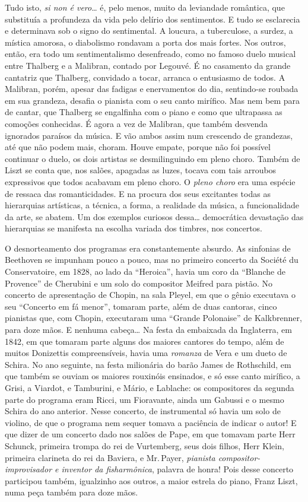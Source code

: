 Tudo isto, \textit{si non é vero}\ldots{} é, pelo menos, muito da leviandade
romântica, que substituía a profundeza da vida pelo delírio dos
sentimentos. E tudo se esclarecia e determinava sob o signo do
sentimental. A loucura, a tuberculose, a surdez, a mística amorosa, o
diabolismo rondavam a porta dos mais fortes. Nos outros, então, era todo
um sentimentalismo desenfreado, como no famoso duelo musical entre
Thalberg e a Malibran, contado por Legouvé. É no casamento da grande
cantatriz que Thalberg, convidado a tocar, arranca o entusiasmo de
todos. A Malibran, porém, apesar das fadigas e enervamentos do dia,
sentindo-se roubada em sua grandeza, desafia o pianista com o seu
canto mirífico. Mas nem bem para de cantar, que Thalberg se engalfinha
com o piano e como que ultrapassa as comoções conhecidas. É agora a vez
de Malibran, que também desvenda ignorados paraísos da música. E vão
ambos assim num crescendo de grandezas, até que não podem mais, choram.
Houve empate, porque não foi possível continuar o duelo, os dois
artistas se desmilinguindo em pleno choro. Também de Liszt se conta que,
nos salões, apagadas as luzes, tocava com tais arroubos expressivos que
todos acabavam em pleno choro. O \textit{pleno choro} era uma espécie de
ressaca das romanticidades. E na procura dos seus excitantes todas as
hierarquias artísticas, a técnica, a forma, a realidade da música, a
funcionalidade da arte, se abatem. Um dos exemplos curiosos dessa\ldots{}
democrática devastação das hierarquias se manifesta na escolha variada
dos timbres, nos concertos.

O desnorteamento dos programas era constantemente absurdo. As sinfonias
de Beethoven se impunham pouco a pouco, mas no primeiro concerto da
Société du Conservatoire, em 1828, ao lado da ``Heroica'', havia um coro
da ``Blanche de Provence'' de Cherubini e um solo do compositor Meifred
para pistão. No concerto de apresentação de Chopin, na sala Pleyel, em
que o gênio executava o seu ``Concerto em fá menor'', tomaram parte,
além de duas cantoras, cinco pianistas que, com Chopin, executaram uma
``Grande Polonaise'' de Kalkbrenner, para doze mãos. E nenhuma cabeça\ldots{}
Na festa da embaixada da Inglaterra, em 1842, em que tomaram parte
alguns dos maiores cantores do tempo, além de muitos Donizettis
compreensíveis, havia uma \textit{romanza} de Vera e um dueto de Schira. No
ano seguinte, na festa milionária do barão James de Rothschild, em que
também se ouviam os maiores rouxinóis ensinados, e só esse canto
mirífico, a Grisi, a Viardot, e Tamburini, e Mário, e Lablache: os
compositores da segunda parte do programa eram Ricci, um Fioravante,
ainda um Gabussi e o mesmo Schira do ano anterior. Nesse concerto, de
instrumental só havia um solo de violino, de que o programa nem sequer
tomava a paciência de indicar o autor! E que dizer de um concerto dado
nos salões de Pape, em que tomavam parte Herr Schunck, primeira trompa
do rei de Vurtemberg, seus dois filhos, Herr Klein, primeira clarineta
do rei da Baviera, e Mr.\,Payer, \textit{pianista compositor-improvisador e
inventor da fisharmônica}, palavra de honra! Pois desse concerto
participou também, igualzinho aos outros, a maior estrela do piano,
Franz Liszt, numa peça também para doze mãos.

